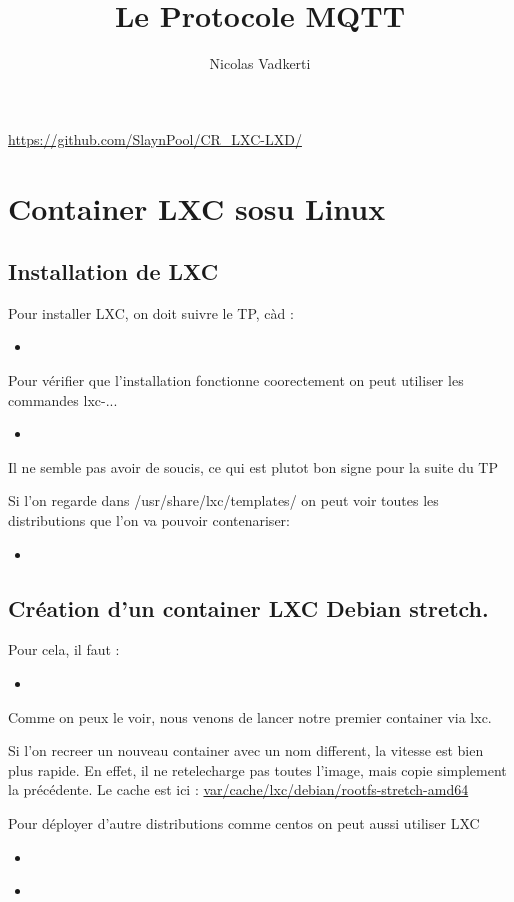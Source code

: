 \documentclass[10pt,a4paper]{article}
\title{Le Protocole MQTT}
\author{Nicolas Vadkerti}
\newcommand{\insertcode}[2]{\begin{itemize}\item[]\end{itemize}}
\begin{document}
\maketitle


\url{https://github.com/SlaynPool/CR_LXC-LXD/}

\section {Container LXC sosu Linux}
\subsection{Installation de LXC}
Pour installer LXC, on doit suivre le TP, càd :
\insertcode{commande/1.txt}{Installation de LXC}

 Pour vérifier que l'installation fonctionne coorectement on peut utiliser les commandes lxc-...
 \insertcode{commande/2.txt}{Verification de LXC}
 Il ne semble pas avoir de soucis, ce qui est plutot bon signe pour la suite du TP 

 Si l'on regarde dans /usr/share/lxc/templates/ on peut voir toutes les distributions que l'on va pouvoir contenariser:
 \insertcode{commande/3.txt}{listes des distributions contenarisables}
 
 
 \subsection{Création d’un container LXC Debian stretch.}
 
 
 Pour cela, il faut :
 \insertcode{commande/4.txt}{premier container}
 Comme on peux le voir, nous venons de lancer notre premier container via lxc.
 
 Si l'on recreer un nouveau container avec un nom different, la vitesse est bien plus rapide. En effet, il ne retelecharge pas toutes l'image, mais copie simplement la précédente. Le cache est ici : \url{var/cache/lxc/debian/rootfs-stretch-amd64}
 
 
 Pour déployer d'autre distributions comme centos on peut aussi utiliser LXC
 \insertcode{commande/5.txt}{LXC centos}
 


\insertcode{commande/6.txt}{Les commandes utiles }
\end{document}
